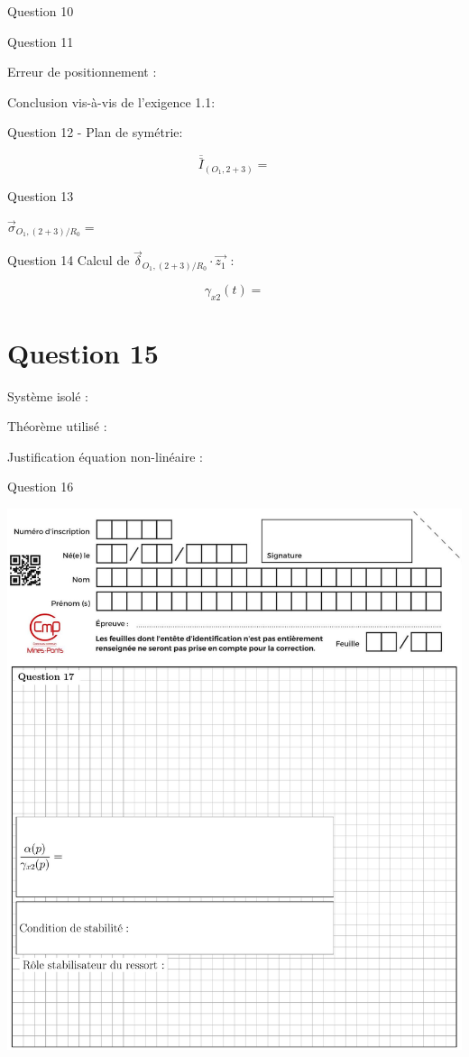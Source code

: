 \documentclass[10pt]{article}
\begin{document}
Question 10

Question 11

Erreur de positionnement :

Conclusion vis-à-vis de l'exigence 1.1:

Question 12 - Plan de symétrie:

$$
\overline{\bar{I}}_{\left(O_{1}, 2+3\right)}=
$$

Question 13

$\vec{\sigma}_{O_{1},(2+3) / R_{0}}=$

Question 14 Calcul de $\vec{\delta}_{O_{1},(2+3) / R_{0}} \cdot \overrightarrow{z_{1}}$ :

$$
\gamma_{x 2}(t)=
$$

\section*{Question 15}
Système isolé :

Théorème utilisé :

Justification équation non-linéaire :

Question 16

\begin{center}
\includegraphics[max width=\textwidth]{2024_04_26_3285cfc264024262add0g-28}
\end{center}
\end{document}
